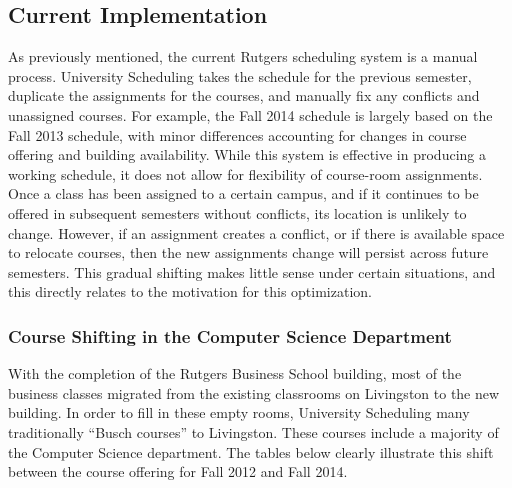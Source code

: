 \documentclass[12pt]{article}
\begin{document}
	\subsection{Current Implementation}
		As previously mentioned, the current Rutgers scheduling system is a manual
		process. University Scheduling takes the schedule for the previous semester,
		duplicate the assignments for the courses, and manually fix any conflicts and
		unassigned courses. For example, the Fall 2014 schedule is largely based on the
		Fall 2013 schedule, with minor differences accounting for changes in course
		offering and building availability. While this system is effective in producing
		a working schedule, it does not allow for flexibility of course-room
		assignments. Once a class has been assigned to a certain campus, and if it
		continues to be offered in subsequent semesters without conflicts, its location
		is unlikely to change. However, if an assignment creates a conflict, or if
		there is available space to relocate courses, then the new assignments change
		will persist across future semesters. This gradual shifting makes little sense
		under certain situations, and this directly relates to the motivation for this
		optimization.

		\subsubsection{Course Shifting in the Computer Science Department}
			With the completion of the Rutgers Business School building, most of the
			business classes migrated from the existing classrooms on Livingston to the new
			building. In order to fill in these empty rooms, University Scheduling many
			traditionally “Busch courses” to Livingston. These courses include a majority
			of the Computer Science department. The tables below clearly illustrate this
			shift between the course offering for Fall 2012 and Fall 2014.
			
\end{document}
